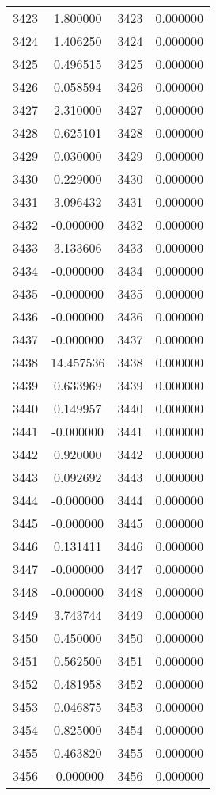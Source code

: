 \documentclass[12pt]{article}
\begin{document}
\begin{longtable}{@{}cccc@{}}
3423 & 1.800000 & 3423 & 0.000000 \\
3424 & 1.406250 & 3424 & 0.000000 \\
3425 & 0.496515 & 3425 & 0.000000 \\
3426 & 0.058594 & 3426 & 0.000000 \\
3427 & 2.310000 & 3427 & 0.000000 \\
3428 & 0.625101 & 3428 & 0.000000 \\
3429 & 0.030000 & 3429 & 0.000000 \\
3430 & 0.229000 & 3430 & 0.000000 \\
3431 & 3.096432 & 3431 & 0.000000 \\
3432 & -0.000000 & 3432 & 0.000000 \\
3433 & 3.133606 & 3433 & 0.000000 \\
3434 & -0.000000 & 3434 & 0.000000 \\
3435 & -0.000000 & 3435 & 0.000000 \\
3436 & -0.000000 & 3436 & 0.000000 \\
3437 & -0.000000 & 3437 & 0.000000 \\
3438 & 14.457536 & 3438 & 0.000000 \\
3439 & 0.633969 & 3439 & 0.000000 \\
3440 & 0.149957 & 3440 & 0.000000 \\
3441 & -0.000000 & 3441 & 0.000000 \\
3442 & 0.920000 & 3442 & 0.000000 \\
3443 & 0.092692 & 3443 & 0.000000 \\
3444 & -0.000000 & 3444 & 0.000000 \\
3445 & -0.000000 & 3445 & 0.000000 \\
3446 & 0.131411 & 3446 & 0.000000 \\
3447 & -0.000000 & 3447 & 0.000000 \\
3448 & -0.000000 & 3448 & 0.000000 \\
3449 & 3.743744 & 3449 & 0.000000 \\
3450 & 0.450000 & 3450 & 0.000000 \\
3451 & 0.562500 & 3451 & 0.000000 \\
3452 & 0.481958 & 3452 & 0.000000 \\
3453 & 0.046875 & 3453 & 0.000000 \\
3454 & 0.825000 & 3454 & 0.000000 \\
3455 & 0.463820 & 3455 & 0.000000 \\
3456 & -0.000000 & 3456 & 0.000000 \\

\end{longtable}
\end{document}
